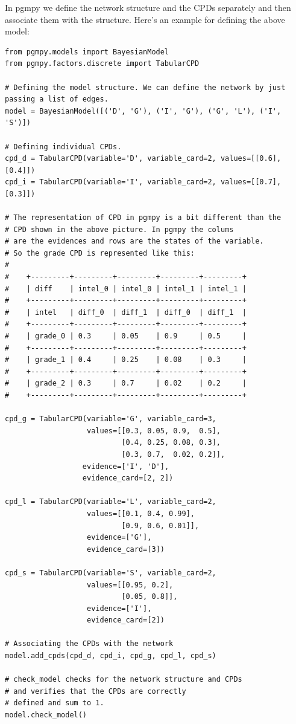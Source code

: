 \documentclass{article}
\begin{document}
In pgmpy we define the network structure and the CPDs separately and then associate them with the structure. Here's an example for defining the above model:

\begin{verbatim}
from pgmpy.models import BayesianModel
from pgmpy.factors.discrete import TabularCPD

# Defining the model structure. We can define the network by just passing a list of edges.
model = BayesianModel([('D', 'G'), ('I', 'G'), ('G', 'L'), ('I', 'S')])

# Defining individual CPDs.
cpd_d = TabularCPD(variable='D', variable_card=2, values=[[0.6], [0.4]])
cpd_i = TabularCPD(variable='I', variable_card=2, values=[[0.7], [0.3]])

# The representation of CPD in pgmpy is a bit different than the
# CPD shown in the above picture. In pgmpy the colums
# are the evidences and rows are the states of the variable. 
# So the grade CPD is represented like this:
#
#    +---------+---------+---------+---------+---------+
#    | diff    | intel_0 | intel_0 | intel_1 | intel_1 |
#    +---------+---------+---------+---------+---------+
#    | intel   | diff_0  | diff_1  | diff_0  | diff_1  |
#    +---------+---------+---------+---------+---------+
#    | grade_0 | 0.3     | 0.05    | 0.9     | 0.5     |
#    +---------+---------+---------+---------+---------+
#    | grade_1 | 0.4     | 0.25    | 0.08    | 0.3     |
#    +---------+---------+---------+---------+---------+
#    | grade_2 | 0.3     | 0.7     | 0.02    | 0.2     |
#    +---------+---------+---------+---------+---------+

cpd_g = TabularCPD(variable='G', variable_card=3,
                   values=[[0.3, 0.05, 0.9,  0.5],
                           [0.4, 0.25, 0.08, 0.3],
                           [0.3, 0.7,  0.02, 0.2]],
                  evidence=['I', 'D'],
                  evidence_card=[2, 2])

cpd_l = TabularCPD(variable='L', variable_card=2,
                   values=[[0.1, 0.4, 0.99],
                           [0.9, 0.6, 0.01]],
                   evidence=['G'],
                   evidence_card=[3])

cpd_s = TabularCPD(variable='S', variable_card=2,
                   values=[[0.95, 0.2],
                           [0.05, 0.8]],
                   evidence=['I'],
                   evidence_card=[2])

# Associating the CPDs with the network
model.add_cpds(cpd_d, cpd_i, cpd_g, cpd_l, cpd_s)

# check_model checks for the network structure and CPDs 
# and verifies that the CPDs are correctly
# defined and sum to 1.
model.check_model()
\end{verbatim}
\end{document}
